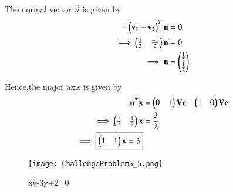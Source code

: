 \documentclass[journal,12pt,twocolumn]{IEEEtran}
\begin{document}
\begin{enumerate}
    The normal vector $\vec{n}$ is given by
    \begin{align}
        -\begin{pmatrix}\mathbf{v_1}-\mathbf{v_2}\end{pmatrix}^T\mathbf{n} &= 0
        \\
        \implies \begin{pmatrix}\frac{1}{2} & \frac{-1}{2}\end{pmatrix}\mathbf{n} &= 0
        \\
        \implies \mathbf{n} &= \begin{pmatrix}\frac{1}{2} \\ \frac{1}{2}\end{pmatrix}
    \end{align}
    
    Hence,the major axis is given by
    \begin{align}
        \mathbf{n}^T\mathbf{x} &= \begin{pmatrix}0 & 1\end{pmatrix}\mathbf{V}\mathbf{c} - \begin{pmatrix}1 & 0\end{pmatrix}\mathbf{V}\mathbf{c} 
        \\
        \implies \begin{pmatrix}\frac{1}{2} & \frac{1}{2}\end{pmatrix}\mathbf{x} &= \frac{3}{2}
        \\
        \implies \boxed{\begin{pmatrix}1 & 1\end{pmatrix}\mathbf{x} = 3}
    \end{align}
    
    \begin{figure}[!ht]
    \centering
    \texttt{[image: ChallengeProblem5\_5.png]}
    \caption{xy-3y+2=0}
    \label{ex5}	
    \end{figure}
    
\end{enumerate}
\end{document}
